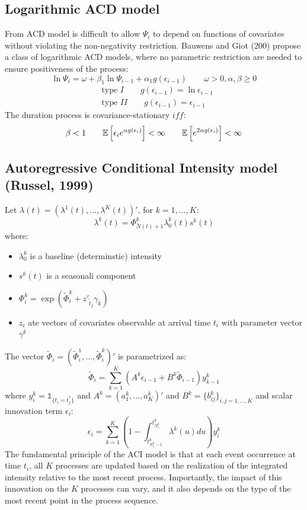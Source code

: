 \subsection{Logarithmic ACD model}
From ACD model is difficult to allow $\Psi_i$ to depend on functions of covariates without violating the non-negativity restriction. Bauwens and Giot (200) propose a class of logarithmic ACD models, where no parametric restriction are needed to ensure positiveness of the process:
\[
\ln \Psi_i = \omega + \beta_1 \ln \Psi_{i-1} + \alpha_1 g (\epsilon_{i-1}) \qquad \omega>0,\alpha,\beta\geq 0 
\]
\begin{align*}
	&\text{type }I \qquad g(\epsilon_{i-1}) = \ln \epsilon_{i-1}\\
	&\text{type }II \qquad  g(\epsilon_{i-1}) = \epsilon_{i-1}
\end{align*}
The duration process is covariance-stationary $iff$:
\[
\beta <1 \qquad \mathbb{E}\left[\epsilon_i e^{\alpha g(\epsilon_i)}\right]<\infty \qquad \mathbb{E}\left[e^{2\alpha g(\epsilon_i)}\right]<\infty
\]
\subsection{Autoregressive Conditional Intensity model (Russel, 1999)}
Let $\lambda(t) = (\lambda^1(t),\ldots, \lambda^K (t))'$, for $k=1,\ldots,K$:
\[
\lambda^k(t) = \Phi^k_{\breve{N}(t)+1} \lambda_0^k(t)s^k(t)
\]
where:
\begin{itemize}
	\item $\lambda_0^k$ is a baseline (determinstic) intensity
	\item $s^k(t)$ is a seasonali component
	\item $\Phi^k_i = \exp(\tilde{\Phi}^k_i + z'_{\tilde{t}_j} \gamma_k)$
	\item $z_i$ ate vectors of covariates observable at arrival time $t_i$ with parameter vector $\gamma^k$
\end{itemize}
The vector $\tilde{\Phi}_i = (\tilde{\Phi}_i^1,\ldots, \tilde{\Phi}_i^k)'$ is parametrized as:
\[
\tilde{\Phi}_i = \sum_{k=1}^{K} (A^k \epsilon_{i-1} + B^k \tilde{\Phi}_{i-1})y^k_{k-1}
\]
where $y_i^k = \mathds{1}_{\{t_i = t_j^*\}}$ and $A^k = (a_1^k,\ldots,a^k_K)'$ and $B^k = \{b_{ij}^k\}_{i,j =1,\ldots,K}$ and scalar innovation term $\epsilon_i$:
\[
\epsilon_i = \sum_{k=1}^K \left(1 - \int_{t^k_{N^k_{t_i}-1 }}^{t^k_{N^k_{t_i}}} \lambda^k(u) du\right)y_i^k
\]
The fundamental principle of the ACI model is that at each event occurrence at time $t_i$, all $K$ processes are updated based on the realization of the integrated intensity relative to the most recent process. Importantly, the impact of this innovation on the $K$ processes can vary, and it also depends on the type of the most recent point in the process sequence.
